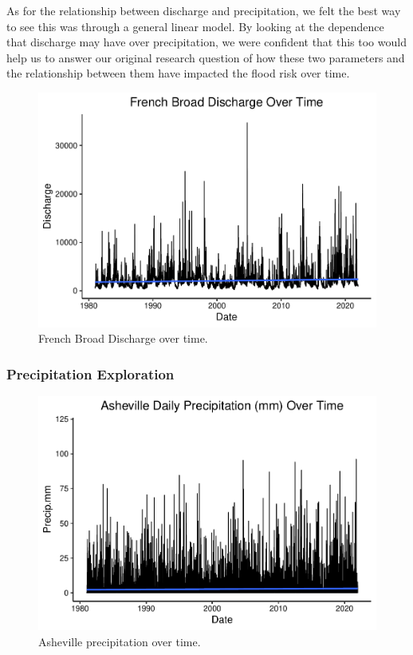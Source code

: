 \documentclass[
]{article}
\begin{document}
As for the relationship between discharge and precipitation, we felt the
best way to see this was through a general linear model. By looking at
the dependence that discharge may have over precipitation, we were
confident that this too would help us to answer our original research
question of how these two parameters and the relationship between them
have impacted the flood risk over time.

\begin{figure}
\centering
\includegraphics{SD_AD_NVT_EDAfinal_files/figure-latex/unnamed-chunk-6-1.pdf}
\caption{French Broad Discharge over time.}
\end{figure}

\hypertarget{precipitation-exploration}{%
\subsubsection{\texorpdfstring{\textbf{Precipitation
Exploration}}{Precipitation Exploration}}\label{precipitation-exploration}}

\begin{figure}
\centering
\includegraphics{SD_AD_NVT_EDAfinal_files/figure-latex/unnamed-chunk-7-1.pdf}
\caption{Asheville precipitation over time.}
\end{figure}
\end{document}

